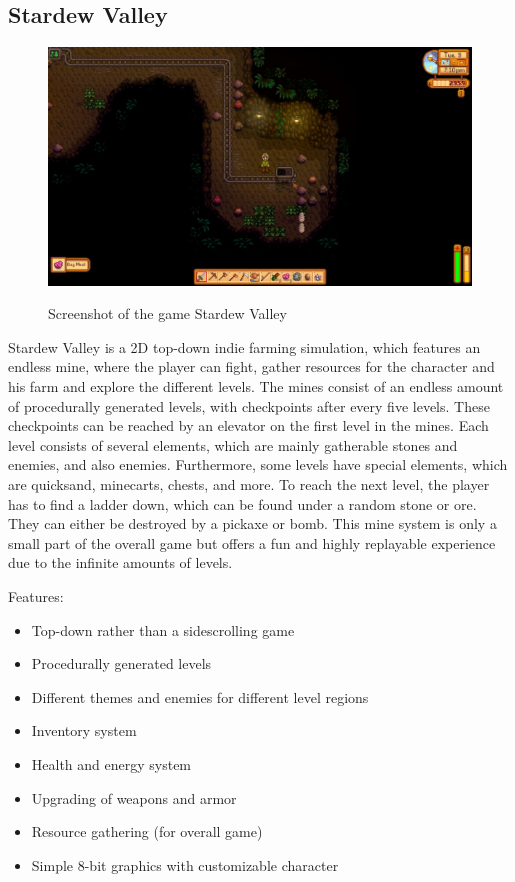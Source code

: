 \documentclass[12p]{article}
\begin{document}

\subsection{Stardew Valley}

\begin{figure}[ht]
    \center
    \includegraphics[width=1\textwidth]{StateOfTheArtScreenshots/stardew_valley}
    \label{StateOfTheArt_Screenshots_StardewValley}
    \caption{Screenshot of the game Stardew Valley \cite{StardewValleyScreenshot}}
\end{figure}

Stardew Valley is a 2D top-down indie farming simulation, which features an endless mine, where the player can fight, gather resources for the character and his farm and explore the different levels. The mines consist of an endless amount of procedurally generated levels, with checkpoints after every five levels. These checkpoints can be reached by an elevator on the first level in the mines. Each level consists of several elements, which are mainly gatherable stones and enemies, and also enemies. Furthermore, some levels have special elements, which are quicksand, minecarts, chests, and more. To reach the next level, the player has to find a ladder down, which can be found under a random stone or ore. They can either be destroyed by a pickaxe or bomb. This mine system is only a small part of the overall game but offers a fun and highly replayable experience due to the infinite amounts of levels.

Features:

\begin{itemize}
    \item Top-down rather than a sidescrolling game
    \item Procedurally generated levels
    \item Different themes and enemies for different level regions
    \item Inventory system
    \item Health and energy system
    \item Upgrading of weapons and armor
    \item Resource gathering (for overall game)
    \item Simple 8-bit graphics with customizable character
\end{itemize}
\end{document}
